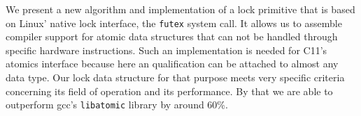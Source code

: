We present a new algorithm and implementation of a lock primitive that
is based on Linux' native lock interface, the \texttt{futex} system
call. It allows us to assemble compiler support for atomic data
structures that can not be handled through specific hardware
instructions.  Such an implementation is needed for C11's atomics
interface because here an  qualification can be attached
to almost any data type. Our lock data structure for that purpose
meets very specific criteria concerning its field of operation and its
performance. By that we are able to outperform gcc's
\texttt{libatomic} library by around 60\%.

